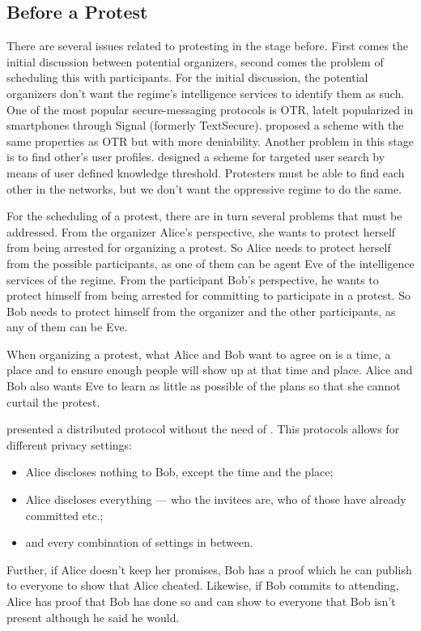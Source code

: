 \documentclass[a4paper]{llncs}
\begin{document}
\subsection{Before a Protest}
\label{BeforeProtest}

There are several issues related to protesting in the stage before.
First comes the initial discussion between potential organizers, second comes 
the problem of scheduling this with participants.
For the initial discussion, the potential organizers don't want the regime's 
intelligence services to identify them as such.
One of the most popular secure-messaging protocols is \ac{OTR}, latelt 
popularized in smartphones through Signal (formerly TextSecure).
\citet{OTPKX} proposed a scheme with the same properties as \ac{OTR} but with 
more deniability.
Another problem in this stage is to find other's user profiles.
\citet{ThresholdUserSearch} designed a scheme for targeted user search by means 
of user defined knowledge threshold.
Protesters must be able to find each other in the networks, but we don't want 
the oppressive regime to do the same.

For the scheduling of a protest, there are in turn several problems that must 
be addressed.
From the organizer Alice's perspective, she wants to protect herself from being 
arrested for organizing a protest.
So Alice needs to protect herself from the possible participants, as one of 
them can be agent Eve of the intelligence services of the regime.
From the participant Bob's perspective, he wants to protect himself from being 
arrested for committing to participate in a protest.
So Bob needs to protect himself from the organizer and the other participants, 
as any of them can be Eve.

When organizing a protest, what Alice and Bob want to agree on is a time, 
a place and to ensure enough people will show up at that time and place.
Alice and Bob also wants Eve to learn as little as possible of the plans so 
that she cannot curtail the protest.

\citet{EventsInvitations} presented a distributed protocol without the need of 
.
This protocols allows for different privacy settings:
\begin{itemize}
\item Alice discloses nothing to Bob, except the time and the place;
\item Alice discloses everything --- who the invitees are, who of those have 
  already committed etc.;
\item and every combination of settings in between.
\end{itemize}
Further, if Alice doesn't keep her promises, Bob has a proof which he can 
publish to everyone to show that Alice cheated.
Likewise, if Bob commits to attending, Alice has proof that Bob has done so and 
can show to everyone that Bob isn't present although he said he would.
\end{document}
